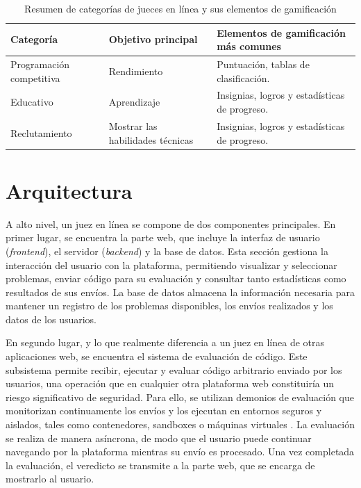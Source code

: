 \begin{table}[h!]
\centering
\small
\begin{tabularx}{\textwidth}{l l X}
\toprule
\textbf{Categoría} & \textbf{Objetivo principal} & \textbf{Elementos de gamificación más comunes} \\
\midrule
Programación competitiva & Rendimiento & Puntuación, tablas de clasificación. \\
\midrule
Educativo & Aprendizaje & Insignias, logros y estadísticas de progreso. \\
\midrule
Reclutamiento & Mostrar las habilidades técnicas & Insignias, logros y estadísticas de progreso. \\
\bottomrule
\end{tabularx}
\caption{Resumen de categorías de jueces en línea y sus elementos de gamificación}
\label{tab:Comparación de tipos de OJ}
\end{table}

\section{Arquitectura}

A alto nivel, un juez en línea se compone de dos componentes principales. En primer lugar, se encuentra la parte web, que incluye la interfaz de usuario (\textit{frontend}), el servidor (\textit{backend}) y la base de datos. Esta sección gestiona la interacción del usuario con la plataforma, permitiendo visualizar y seleccionar problemas, enviar código para su evaluación y consultar tanto estadísticas como resultados de sus envíos. La base de datos almacena la información necesaria para mantener un registro de los problemas disponibles, los envíos realizados y los datos de los usuarios.

En segundo lugar, y lo que realmente diferencia a un juez en línea de otras aplicaciones web, se encuentra el sistema de evaluación de código. Este subsistema permite recibir, ejecutar y evaluar código arbitrario enviado por los usuarios, una operación que en cualquier otra plataforma web constituiría un riesgo significativo de seguridad. Para ello, se utilizan demonios de evaluación que monitorizan continuamente los envíos y los ejecutan en entornos seguros y aislados, tales como contenedores, sandboxes o máquinas virtuales \citep{Kuo_Wen_Hsieh_Huang_2023}. La evaluación se realiza de manera asíncrona, de modo que el usuario puede continuar navegando por la plataforma mientras su envío es procesado. Una vez completada la evaluación, el veredicto se transmite a la parte web, que se encarga de mostrarlo al usuario.

